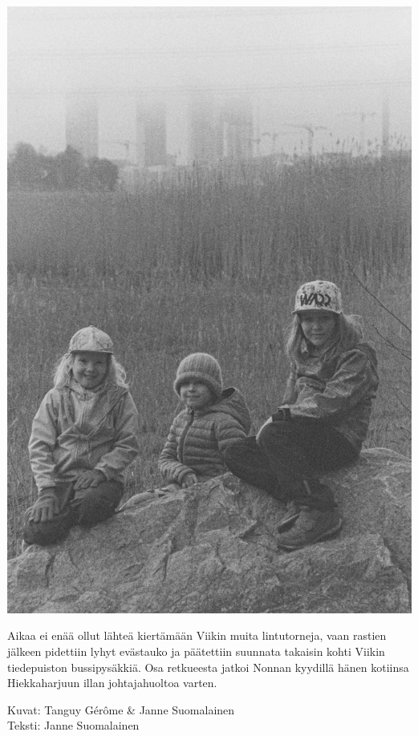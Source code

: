 \begin{multicols}{2}

	\vspace*{0.16cm}
	\begin{center}
		\noindent\includegraphics[width=0.8\linewidth]{assets/kolkkienpäiväretkibw13}
	\end{center}


	Aikaa ei enää ollut lähteä kiertämään Viikin muita lintutorneja, vaan
	rastien jälkeen pidettiin lyhyt evästauko ja päätettiin suunnata
	takaisin kohti Viikin tiedepuiston bussipysäkkiä. Osa retkueesta jatkoi
	Nonnan kyydillä hänen kotiinsa Hiekkaharjuun illan johtajahuoltoa
	varten.




\end{multicols}
\vspace*{1.28cm}

\medskip
\noindent\null\hfill Kuvat: Tanguy Gérôme \& Janne Suomalainen\\
\noindent\null\hfill Teksti: Janne Suomalainen

